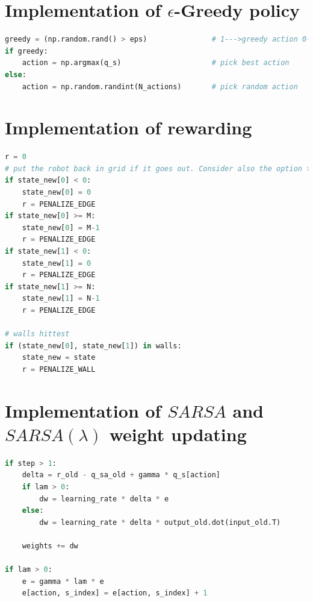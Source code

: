 \documentclass[conference]{IEEEtran}
\begin{document}



\onecolumn
\appendices{}

\section{Implementation of \({\epsilon}\)-Greedy policy}

\begin{lstlisting}[language=Python]
greedy = (np.random.rand() > eps)               # 1--->greedy action 0--->non-greedy action
if greedy:
    action = np.argmax(q_s)                     # pick best action
else:
    action = np.random.randint(N_actions)       # pick random action

\end{lstlisting}

\section{Implementation of rewarding}

\begin{lstlisting}[language=Python]
r = 0
# put the robot back in grid if it goes out. Consider also the option to give a negative reward
if state_new[0] < 0:
    state_new[0] = 0
    r = PENALIZE_EDGE
if state_new[0] >= M:
    state_new[0] = M-1
    r = PENALIZE_EDGE
if state_new[1] < 0:
    state_new[1] = 0
    r = PENALIZE_EDGE
if state_new[1] >= N:
    state_new[1] = N-1
    r = PENALIZE_EDGE

# walls hittest
if (state_new[0], state_new[1]) in walls:
    state_new = state
    r = PENALIZE_WALL

\end{lstlisting}

\section{Implementation of \(SARSA\) and \(SARSA(\lambda)\) weight updating}

\begin{lstlisting}[language=Python]
if step > 1:
    delta = r_old - q_sa_old + gamma * q_s[action]
    if lam > 0:
        dw = learning_rate * delta * e
    else:
        dw = learning_rate * delta * output_old.dot(input_old.T)
        
    weights += dw

if lam > 0:
    e = gamma * lam * e
    e[action, s_index] = e[action, s_index] + 1

\end{lstlisting}
\end{document}
